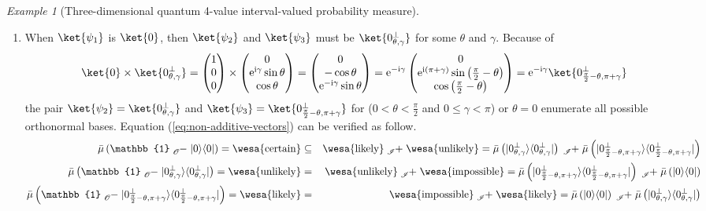 \documentclass{article}
\theoremstyle{remark}
\newtheorem{example}{Example}
\newcommand{\proj}[1]{|#1 \rangle\langle #1 |}
\newcommand{\imposs}{{\mbox{\wesa{impossible}}}}
\newcommand{\likely}{{\mbox{\wesa{likely}}}}
\newcommand{\unlikely}{{\mbox{\wesa{unlikely}}}}
\newcommand{\necess}{{\mbox{\wesa{certain}}}}
\newcommand{\rme}{\mathrm{e}}
\newcommand{\rmi}{\mathrm{i}}
\begin{document}
\begin{example}[Three-dimensional quantum 4-value interval-valued
probability measure]
\begin{enumerate}
\item When $\ket{\psi_{1}}$ is $\ket{0}$, then $\ket{\psi_{2}}$ and $\ket{\psi_{3}}$
must be $\ket{0_{\theta,\gamma}^{\perp}}$ for some $\theta$ and
$\gamma$. Because of 
\[
\ket{0}\times\ket{0_{\theta,\gamma}^{\perp}}=\begin{pmatrix}1\\
0\\
0
\end{pmatrix}\times\begin{pmatrix}0\\
\rme^{\rmi\gamma}\sin\theta\\
\cos\theta
\end{pmatrix}=\begin{pmatrix}0\\
-\cos\theta\\
\rme^{-\rmi\gamma}\sin\theta
\end{pmatrix}=\rme^{-\rmi\gamma}\begin{pmatrix}0\\
\rme^{\rmi\left(\pi+\gamma\right)}\sin\left(\frac{\pi}{2}-\theta\right)\\
\cos\left(\frac{\pi}{2}-\theta\right)
\end{pmatrix}=\rme^{-\rmi\gamma}\ket{0_{\frac{\pi}{2}-\theta,\pi+\gamma}^{\perp}}
\]
the pair $\ket{\psi_{2}}=\ket{0_{\theta,\gamma}^{\perp}}$ and $\ket{\psi_{3}}=\ket{0_{\frac{\pi}{2}-\theta,\pi+\gamma}^{\perp}}$
for ($0<\theta<\frac{\pi}{2}$ and $0\le\gamma<\pi$) or $\theta=0$
enumerate all possible orthonormal bases. Equation (\ref{eq:non-additive-vectors})
can be verified as follow. 
\begin{eqnarray*}
\bar{\mu}\left(\mathbb{1}\tensor*[_{\mathscr{O}}]{-}{}\proj{0}\right)=\necess & \subseteq & \likely\tensor*[_{\mathscr{I}}]{+}{}\unlikely=\bar{\mu}\left(\proj{0_{\theta,\gamma}^{\perp}}\right)\tensor*[_{\mathscr{I}}]{+}{}\bar{\mu}\left(\proj{0_{\frac{\pi}{2}-\theta,\pi+\gamma}^{\perp}}\right)\\
\bar{\mu}\left(\mathbb{1}\tensor*[_{\mathscr{O}}]{-}{}\proj{0_{\theta,\gamma}^{\perp}}\right)=\unlikely & = & \unlikely\tensor*[_{\mathscr{I}}]{+}{}\imposs=\bar{\mu}\left(\proj{0_{\frac{\pi}{2}-\theta,\pi+\gamma}^{\perp}}\right)\tensor*[_{\mathscr{I}}]{+}{}\bar{\mu}\left(\proj{0}\right)\\
\bar{\mu}\left(\mathbb{1}\tensor*[_{\mathscr{O}}]{-}{}\proj{0_{\frac{\pi}{2}-\theta,\pi+\gamma}^{\perp}}\right)=\likely & = & \imposs\tensor*[_{\mathscr{I}}]{+}{}\likely=\bar{\mu}\left(\proj{0}\right)\tensor*[_{\mathscr{I}}]{+}{}\bar{\mu}\left(\proj{0_{\theta,\gamma}^{\perp}}\right)

\end{eqnarray*}
\end{enumerate}
\end{example}
\end{document}
